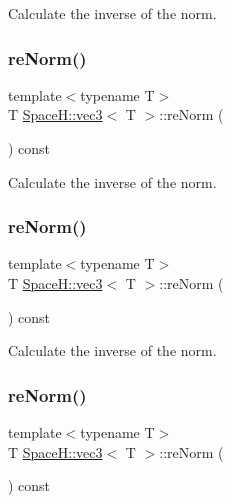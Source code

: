 Calculate the inverse of the norm. 

\mbox{\label{struct_space_h_1_1vec3_a90d3f8ac98cf17cb20986997daaf9e0e}} 
\subsubsection{\texorpdfstring{re\+Norm()}{reNorm()}\hspace{0.1cm}{\footnotesize\ttfamily [2/4]}}
{\footnotesize\ttfamily template$<$typename T$>$ \\
T \mbox{\hyperlink{struct_space_h_1_1vec3}{Space\+H\+::vec3}}$<$ T $>$\+::re\+Norm (\begin{DoxyParamCaption}{ }\end{DoxyParamCaption}) const\hspace{0.3cm}{\ttfamily [inline]}}



Calculate the inverse of the norm. 

\mbox{\label{struct_space_h_1_1vec3_a90d3f8ac98cf17cb20986997daaf9e0e}} 
\subsubsection{\texorpdfstring{re\+Norm()}{reNorm()}\hspace{0.1cm}{\footnotesize\ttfamily [3/4]}}
{\footnotesize\ttfamily template$<$typename T$>$ \\
T \mbox{\hyperlink{struct_space_h_1_1vec3}{Space\+H\+::vec3}}$<$ T $>$\+::re\+Norm (\begin{DoxyParamCaption}{ }\end{DoxyParamCaption}) const\hspace{0.3cm}{\ttfamily [inline]}}



Calculate the inverse of the norm. 

\mbox{\label{struct_space_h_1_1vec3_a90d3f8ac98cf17cb20986997daaf9e0e}} 
\subsubsection{\texorpdfstring{re\+Norm()}{reNorm()}\hspace{0.1cm}{\footnotesize\ttfamily [4/4]}}
{\footnotesize\ttfamily template$<$typename T$>$ \\
T \mbox{\hyperlink{struct_space_h_1_1vec3}{Space\+H\+::vec3}}$<$ T $>$\+::re\+Norm (\begin{DoxyParamCaption}{ }\end{DoxyParamCaption}) const\hspace{0.3cm}{\ttfamily [inline]}}



